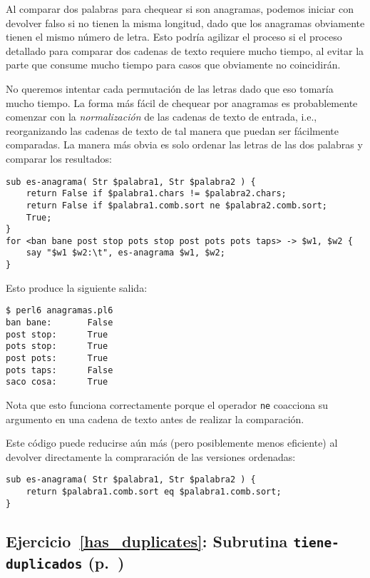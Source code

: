 Al comparar dos palabras para chequear si son anagramas, 
podemos iniciar con devolver falso si no tienen la misma
longitud, dado que los anagramas obviamente tienen 
el mismo número de letra. Esto podría agilizar el proceso 
si el proceso detallado para comparar dos cadenas de texto
requiere mucho tiempo, al evitar la parte que consume mucho
tiempo para casos que obviamente no coincidirán.


No queremos intentar cada permutación de las letras
dado que eso tomaría mucho tiempo. La forma más fácil 
de chequear por anagramas es probablemente comenzar 
con la \emph{normalización} de las cadenas de texto de
entrada, i.e., reorganizando las cadenas de texto de
tal manera que puedan ser fácilmente comparadas. La manera
más obvia es solo ordenar las letras de las dos palabras
y comparar los resultados:

\begin{verbatim}
sub es-anagrama( Str $palabra1, Str $palabra2 ) {
    return False if $palabra1.chars != $palabra2.chars;
    return False if $palabra1.comb.sort ne $palabra2.comb.sort;
    True;
}
for <ban bane post stop pots stop post pots pots taps> -> $w1, $w2 {
    say "$w1 $w2:\t", es-anagrama $w1, $w2;
}
\end{verbatim}

Esto produce la siguiente salida:
\begin{verbatim}
$ perl6 anagramas.pl6
ban bane:       False
post stop:      True
pots stop:      True
post pots:      True
pots taps:      False
saco cosa: 		True
\end{verbatim}

Nota que esto funciona correctamente porque el operador
{\tt ne} coacciona su argumento en una cadena de texto antes
de realizar la comparación.

Este código puede reducirse aún más (pero posiblemente 
menos eficiente) al devolver directamente la compraración 
de las versiones ordenadas:

\begin{verbatim}
sub es-anagrama( Str $palabra1, Str $palabra2 ) {
    return $palabra1.comb.sort eq $palabra1.comb.sort;
}
\end{verbatim}


\subsection{Ejercicio~\ref{has_duplicates}: Subrutina {\tt tiene-duplicados} (p.~\pageref{has_duplicates})}
\label{sol_has_duplicates}

